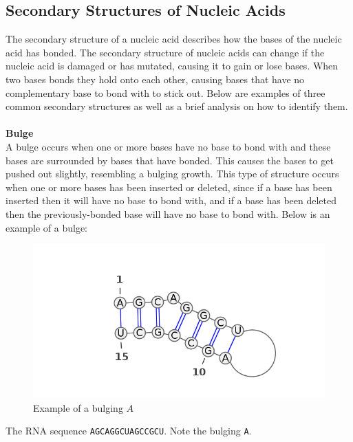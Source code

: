 

\subsection{Secondary Structures of Nucleic Acids}\label{structs}
The secondary structure of a nucleic acid describes how the bases of the 
nucleic acid has bonded. The secondary structure of nucleic acids can change if 
the nucleic acid is damaged or has mutated, causing it to gain or lose 
bases. When two bases bonds they hold onto each other, causing bases that 
have no complementary base to bond with to stick out. Below are examples of three 
common secondary structures as well as a brief analysis on how to identify them.\\\\
\textbf{Bulge}\\ 
A bulge occurs when one or more bases have no base to bond with and these 
bases are surrounded by bases that have bonded. This causes the bases to get 
pushed out slightly, resembling a bulging growth. This type of structure occurs 
when one or more bases has been inserted or deleted, since if a base has been 
inserted then it will have no base to bond with, and if a base has been deleted 
then the previously-bonded base will have no base to bond with. 
Below is an example of a bulge:
\begin{myex}\centering
\begin{figure}[h!]
\centering
\includegraphics[scale=0.4]{./lib/bulge.png}
\caption{Example of a bulging $A$}%
\end{figure}
The RNA sequence {\tt AGCAGGCUAGCCGCU}. Note the bulging {\tt A}.
\end{myex}
